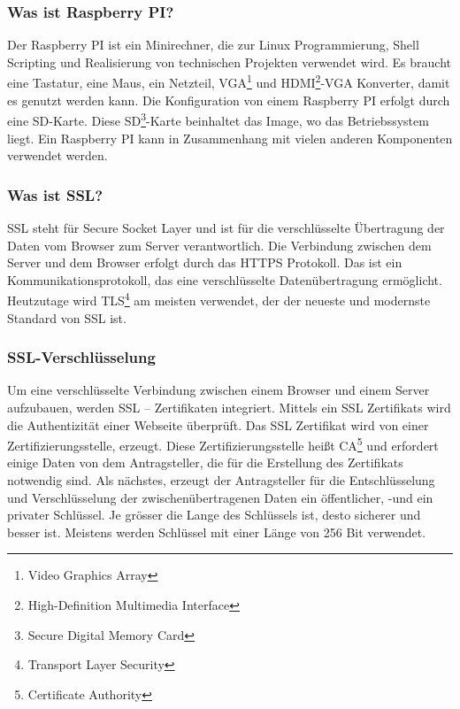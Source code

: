 \subsubsection{Was ist Raspberry PI?} 
Der Raspberry PI ist ein Minirechner, die zur Linux Programmierung, Shell Scripting und Realisierung von technischen Projekten verwendet wird. Es braucht eine Tastatur, eine Maus, ein Netzteil, VGA\footnote{Video Graphics Array} und HDMI\footnote{High-Definition Multimedia Interface}-VGA Konverter, damit es genutzt werden kann. Die Konfiguration von einem Raspberry PI erfolgt durch eine SD-Karte. Diese SD\footnote{Secure Digital Memory Card}-Karte beinhaltet das Image, wo das Betriebssystem liegt. Ein Raspberry PI kann in Zusammenhang mit vielen anderen Komponenten verwendet werden.\cite{50_raspi}
\subsubsection{Was ist SSL?} 
SSL steht für Secure Socket Layer und ist für die verschlüsselte Übertragung der Daten vom Browser zum Server verantwortlich. Die Verbindung zwischen dem Server und dem Browser erfolgt durch das HTTPS Protokoll. Das ist ein Kommunikationsprotokoll, das eine verschlüsselte Datenübertragung ermöglicht. Heutzutage wird TLS\footnote{Transport Layer Security} am meisten verwendet, der der neueste und modernste Standard von SSL ist.\cite{50_ssl}
\subsubsection{SSL-Verschlüsselung}
Um eine verschlüsselte Verbindung zwischen einem Browser und einem Server aufzubauen, werden SSL – Zertifikaten integriert. Mittels ein SSL Zertifikats wird die Authentizität einer Webseite überprüft. Das SSL Zertifikat wird von einer Zertifizierungsstelle, erzeugt. Diese Zertifizierungsstelle heißt CA\footnote{Certificate Authority} und erfordert einige Daten von dem Antragsteller, die für die Erstellung des Zertifikats notwendig sind. Als nächstes, erzeugt der Antragsteller für die Entschlüsselung und Verschlüsselung der zwischenübertragenen Daten ein öffentlicher, -und ein privater Schlüssel. Je grösser die Lange des Schlüssels ist, desto sicherer und besser ist. Meistens werden Schlüssel mit einer Länge von 256 Bit verwendet.\cite{50_ssl}
